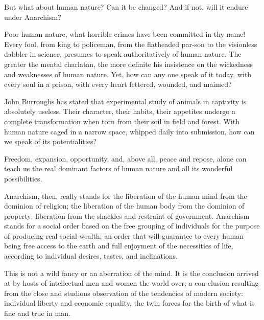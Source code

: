 But what about human nature? Can it be changed? And if not, will it
endure under Anarchism?

Poor human nature, what horrible crimes have been committed in thy
name! Every fool, from king to policeman, from the flatheaded
par-son to the visionless dabbler in science, presumes to
speak authoritatively of human nature. The greater the mental
charlatan, the more definite his insistence on the wickedness and
weaknesses of human nature. Yet, how can any one speak of it today,
with every soul in a prison, with every heart fettered, wounded, and
maimed?

John Burroughs has stated that experimental study of animals in
captivity is absolutely useless. Their character, their habits, their
appetites undergo a complete transformation when torn from their soil
in field and forest. With human nature caged in a narrow space,
whipped daily into submission, how can we speak of its potentialities?

Freedom, expansion, opportunity, and, above all, peace and repose,
alone can teach us the real dominant factors of human nature and all
its wonderful possibilities.

Anarchism, then, really stands for the liberation of the human mind
from the dominion of religion; the liberation of the human body from
the dominion of property; liberation from the shackles and restraint
of government. Anarchism stands for a social order based on the free
grouping of individuals for the purpose of producing real social
wealth; an order that will guarantee to every human being free access
to the earth and full enjoyment of the necessities of life, according
to individual desires, tastes, and inclinations.

This is not a wild fancy or an aberration of the mind. It is the
conclusion arrived at by hosts of intellectual men and women the world
over; a con-clusion resulting from the close and studious
observation of the tendencies of modern society: individual liberty
and economic equality, the twin forces for the birth of what is fine
and true in man.


